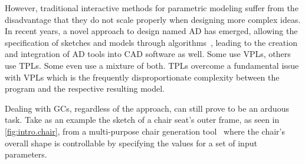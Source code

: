However, traditional interactive methods for parametric modeling suffer from the
disadvantage that they do not scale properly when designing more complex ideas.
In recent years, a novel approach to design named \ac{AD} has emerged, allowing
the specification of sketches and models through
algorithms~\cite{McCormack:2004:GDPDR}, leading to the creation and integration
of \ac{AD} tools into \ac{CAD} software as well.  Some use \acp{VPL}, others use
\acp{TPL}.  Some even use a mixture of both.  \Acp{TPL} overcome a fundamental
issue with \acp{VPL} which is the frequently disproportionate complexity between
the program and the respective resulting model.

Dealing with \acp{GC}, regardless of the approach, can still prove to be an
arduous task.  Take as an example the sketch of a chair seat's outer frame, as
seen in \cref{fig:intro.chair}, from a multi-purpose chair generation
tool~\cite{Garcia:2012:ChairDNA} where the chair's overall shape is controllable
by specifying the values for a set of input parameters.


